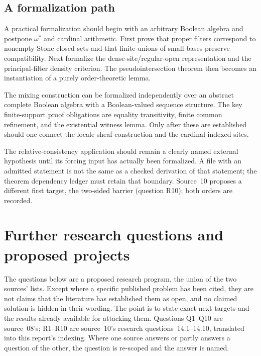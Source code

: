 \documentclass[11pt,letterpaper]{article}
\theoremstyle{definition}
\theoremstyle{remark}
\newcommand{\om}{\omega}
\begin{document}
\subsection{A formalization path}
A practical formalization should begin with an arbitrary Boolean
algebra and postpone $\om^*$ and cardinal arithmetic. First prove
that proper filters correspond to nonempty Stone closed sets and
that finite unions of small bases preserve compatibility. Next
formalize the dense-site/regular-open representation and the
principal-filter density criterion. The pseudointersection theorem
then becomes an instantiation of a purely order-theoretic lemma.

The mixing construction can be formalized independently over an
abstract complete Boolean algebra with a Boolean-valued sequence
structure. The key finite-support proof obligations are equality
transitivity, finite common refinement, and the existential witness
lemma. Only after these are established should one connect the
locale sheaf construction and the cardinal-indexed sites.

The relative-consistency application should remain a clearly
named external hypothesis until its forcing input has actually
been formalized. A file with an admitted statement is not the same
as a checked derivation of that statement; the theorem dependency
ledger must retain that boundary. Source~10 proposes a different first
target, the two-sided barrier (question R10); both orders are recorded.

\section{Further research questions and proposed projects}
\label{fbc:sec:future}

The questions below are a proposed research program, the union of the
two sources' lists. Except where a specific published problem has been
cited, they are not claims that the literature has established them as
open, and no claimed solution is hidden in their wording. The point is
to state exact next targets and the results already available for
attacking them. Questions Q1--Q10 are source~08's; R1--R10 are
source~10's research questions~14.1--14.10, translated into this
report's indexing. Where one source answers or partly answers a question
of the other, the question is re-scoped and the answer is named.
\end{document}

